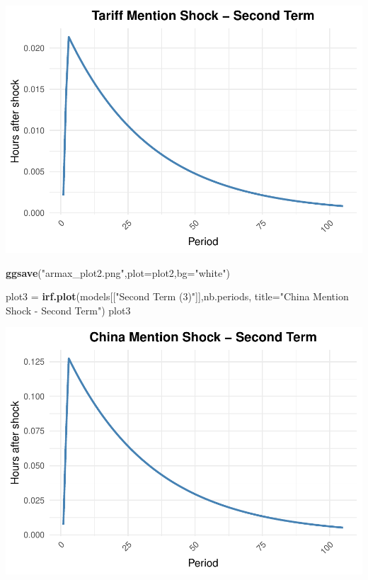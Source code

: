 \documentclass[
]{book}
\newenvironment{Shaded}{\begin{snugshade}}{\end{snugshade}}
\newcommand{\AttributeTok}[1]{\textcolor[rgb]{0.13,0.29,0.53}{#1}}
\newcommand{\FunctionTok}[1]{\textcolor[rgb]{0.13,0.29,0.53}{\textbf{#1}}}
\newcommand{\NormalTok}[1]{#1}
\newcommand{\OtherTok}[1]{\textcolor[rgb]{0.56,0.35,0.01}{#1}}
\newcommand{\StringTok}[1]{\textcolor[rgb]{0.31,0.60,0.02}{#1}}
\begin{document}
\includegraphics{_main_files/figure-latex/2nd SPYirf-1.pdf}

\begin{Shaded}
\begin{Highlighting}[]
\FunctionTok{ggsave}\NormalTok{(}\StringTok{"armax\_plot2.png"}\NormalTok{,}\AttributeTok{plot=}\NormalTok{plot2,}\AttributeTok{bg=}\StringTok{"white"}\NormalTok{)}

\NormalTok{plot3 }\OtherTok{=} \FunctionTok{irf.plot}\NormalTok{(models[[}\StringTok{"Second Term (3)"}\NormalTok{]],nb.periods,}
                 \AttributeTok{title=}\StringTok{"China Mention Shock {-} Second Term"}\NormalTok{)}
\NormalTok{plot3}
\end{Highlighting}
\end{Shaded}

\includegraphics{_main_files/figure-latex/2nd SPYirf-2.pdf}
\end{document}

